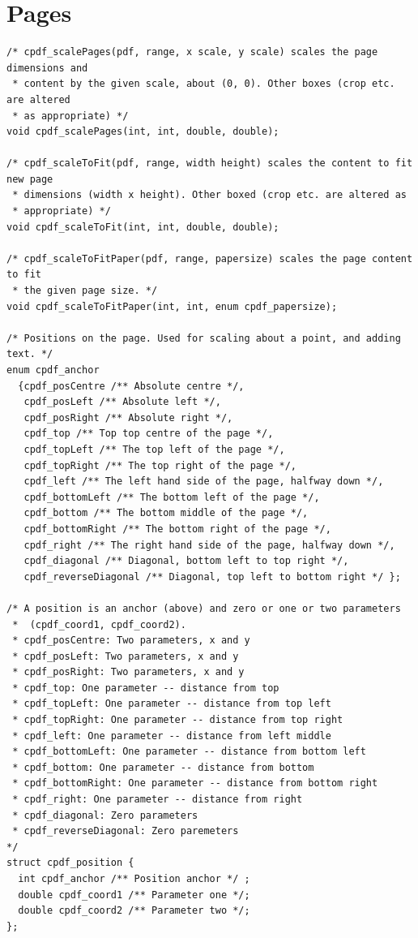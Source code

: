 \documentclass[a4paper]{memoir}
\begin{document}
\chapter{Pages}
\begin{small}
\begin{lstlisting}
/* cpdf_scalePages(pdf, range, x scale, y scale) scales the page dimensions and
 * content by the given scale, about (0, 0). Other boxes (crop etc. are altered
 * as appropriate) */
void cpdf_scalePages(int, int, double, double);

/* cpdf_scaleToFit(pdf, range, width height) scales the content to fit new page
 * dimensions (width x height). Other boxed (crop etc. are altered as
 * appropriate) */
void cpdf_scaleToFit(int, int, double, double);

/* cpdf_scaleToFitPaper(pdf, range, papersize) scales the page content to fit
 * the given page size. */
void cpdf_scaleToFitPaper(int, int, enum cpdf_papersize);

/* Positions on the page. Used for scaling about a point, and adding text. */
enum cpdf_anchor
  {cpdf_posCentre /** Absolute centre */, 
   cpdf_posLeft /** Absolute left */,
   cpdf_posRight /** Absolute right */,
   cpdf_top /** Top top centre of the page */,
   cpdf_topLeft /** The top left of the page */,
   cpdf_topRight /** The top right of the page */,
   cpdf_left /** The left hand side of the page, halfway down */,
   cpdf_bottomLeft /** The bottom left of the page */,
   cpdf_bottom /** The bottom middle of the page */,
   cpdf_bottomRight /** The bottom right of the page */,
   cpdf_right /** The right hand side of the page, halfway down */,
   cpdf_diagonal /** Diagonal, bottom left to top right */,
   cpdf_reverseDiagonal /** Diagonal, top left to bottom right */ };

/* A position is an anchor (above) and zero or one or two parameters
 *  (cpdf_coord1, cpdf_coord2).
 * cpdf_posCentre: Two parameters, x and y
 * cpdf_posLeft: Two parameters, x and y
 * cpdf_posRight: Two parameters, x and y
 * cpdf_top: One parameter -- distance from top
 * cpdf_topLeft: One parameter -- distance from top left
 * cpdf_topRight: One parameter -- distance from top right
 * cpdf_left: One parameter -- distance from left middle
 * cpdf_bottomLeft: One parameter -- distance from bottom left
 * cpdf_bottom: One parameter -- distance from bottom
 * cpdf_bottomRight: One parameter -- distance from bottom right
 * cpdf_right: One parameter -- distance from right
 * cpdf_diagonal: Zero parameters
 * cpdf_reverseDiagonal: Zero paremeters
*/
struct cpdf_position {
  int cpdf_anchor /** Position anchor */ ;
  double cpdf_coord1 /** Parameter one */;
  double cpdf_coord2 /** Parameter two */;
};


\end{lstlisting}
\end{small}
\end{document}
